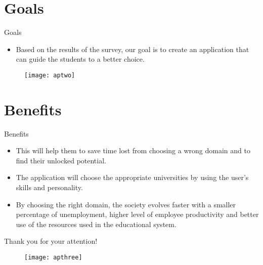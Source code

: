 \documentclass{beamer}
\begin{document}

\section{Goals}
\begin{frame}{Goals}
	
	\begin{itemize}
		\item Based on the results of the survey, our goal is to create an application that can guide the students to a better choice.
	\end{itemize}

	\begin{figure}[t]
		\texttt{[image: aptwo]}
		\centering
	\end{figure}
	
\end{frame}


\section{Benefits}
\begin{frame}{Benefits}
	
	\begin{itemize}
		\item This will help them to save time lost from choosing a wrong domain and to find their unlocked potential.
	\end{itemize}

	\begin{itemize}
		\item The application will choose the appropriate universities by using the user's skills and personality.
	\end{itemize}

	\begin{itemize}
		\item By choosing the right domain, the society evolves faster with a smaller percentage of unemployment, higher level of employee productivity and better use of the resources used in the educational system.
	\end{itemize}

\end{frame}


\begin{frame}{Thank you for your attention!}
	\begin{figure}[t]
		\texttt{[image: apthree]}
		\centering
	
	\end{figure}
	
	
\end{frame} 

\end{document}
